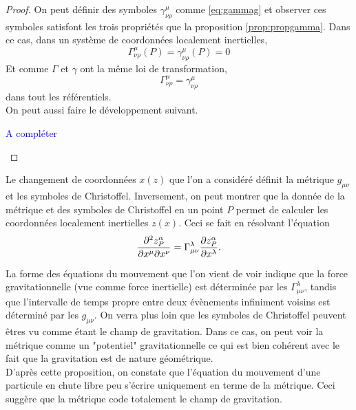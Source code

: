\documentclass[a4paper,11pt]{report}
\theoremstyle{definition}
\theoremstyle{plain}
\theoremstyle{definition}
\theoremstyle{remark}
\newcommand{\comp}{\begin{center}\textcolor{blue}{A compléter}\end{center}}
\begin{document}
            \begin{proof}
                On peut définir des symboles $\gamma^\mu_{\nu\rho}$ comme \ref{eq:gammag} et observer ces symboles satisfont les trois propriétés que la proposition \ref{prop:propgamma}. Dans ce cas, dans un système de coordonnées localement inertielles,
                \begin{equation}
                    \Gamma^\mu_{\nu\rho}(P) = \gamma^\mu_{\nu\rho}(P) = 0
                \end{equation}
                Et comme $\Gamma$ et $\gamma$ ont la même loi de transformation, 
                \begin{equation}
                    \Gamma^\mu_{\nu\rho} = \gamma^\mu_{\nu\rho}
                \end{equation}
                dans tout les référentiels.\\
                
                On peut aussi faire le développement suivant. 
                \comp
            \end{proof}
            
            Le changement de coordonnées $x(z)$ que l'on a considéré définit la métrique $g_{\mu\nu}$ et les symboles de Christoffel. Inversement, on peut montrer que la donnée de la métrique et des symboles de Christoffel en un point $P$ permet de calculer les coordonnées localement inertielles $z(x)$. Ceci se fait en résolvant l'équation
            \begin{equation}
                \pdv{z^\alpha_P}{x^\mu}{x^\nu} = \Gamma^\lambda_{\mu\nu}\pdv{z^\alpha_P}{x^\lambda}.
            \end{equation}
            
            La forme des équations du mouvement que l'on vient de voir indique que la force gravitationnelle (vue comme force inertielle) est déterminée par les $\Gamma^\lambda_{\mu\nu}$, tandis que l'intervalle de temps propre entre deux évènements infiniment voisins est déterminé par les $g_{\mu\nu}$. On verra plus loin que les symboles de Christoffel peuvent êtres vu comme étant le champ de gravitation. Dans ce cas, on peut voir la métrique comme un "potentiel" gravitationnelle ce qui est bien cohérent avec le fait que la gravitation est de nature géométrique.\\
            
            D'après cette proposition, on constate que l'équation du mouvement d'une particule en chute libre peu s'écrire uniquement en terme de la métrique. Ceci suggère que la métrique code totalement le champ de gravitation.
            
\end{document}
